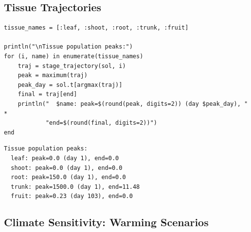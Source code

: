 \subsection{Tissue Trajectories}



\label{11964683681648099304}{}



\begin{verbatim}
tissue_names = [:leaf, :shoot, :root, :trunk, :fruit]

println("\nTissue population peaks:")
for (i, name) in enumerate(tissue_names)
    traj = stage_trajectory(sol, i)
    peak = maximum(traj)
    peak_day = sol.t[argmax(traj)]
    final = traj[end]
    println("  $name: peak=$(round(peak, digits=2)) (day $peak_day), " *
            "end=$(round(final, digits=2))")
end
\end{verbatim}




\begin{verbatim}
Tissue population peaks:
  leaf: peak=0.0 (day 1), end=0.0
  shoot: peak=0.0 (day 1), end=0.0
  root: peak=150.0 (day 1), end=0.0
  trunk: peak=1500.0 (day 1), end=11.48
  fruit: peak=0.23 (day 103), end=0.0
\end{verbatim}



\subsection{Climate Sensitivity: Warming Scenarios}



\label{2425434212087113797}{}



